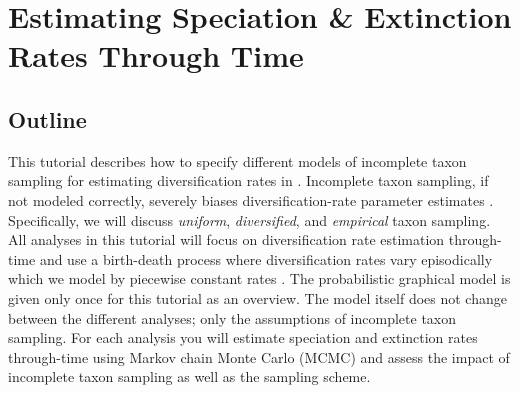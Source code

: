 \section{Estimating Speciation \& Extinction Rates Through Time}

\subsection{Outline}

This tutorial describes how to specify different models of incomplete taxon sampling \citep{Hoehna2011,Hoehna2014a} for estimating diversification rates in \RevBayes \citep{Hoehna2016b}.
Incomplete taxon sampling, if not modeled correctly, severely biases diversification-rate parameter estimates \citep{Cusimano2010,Hoehna2011}. 
Specifically, we will discuss \emph{uniform}, \emph{diversified}, and \emph{empirical} taxon sampling.
All analyses in this tutorial will focus on diversification rate estimation through-time and use a birth-death process where diversification rates vary episodically which we model by piecewise constant rates \RevBayes \citep{Hoehna2015a,May2016}.
The probabilistic graphical model is given only once for this tutorial as an overview.
The model itself does not change between the different analyses; only the assumptions of incomplete taxon sampling.
For each analysis you will estimate speciation and extinction rates through-time using Markov chain Monte Carlo (MCMC) and assess the impact of incomplete taxon sampling as well as the sampling scheme.


